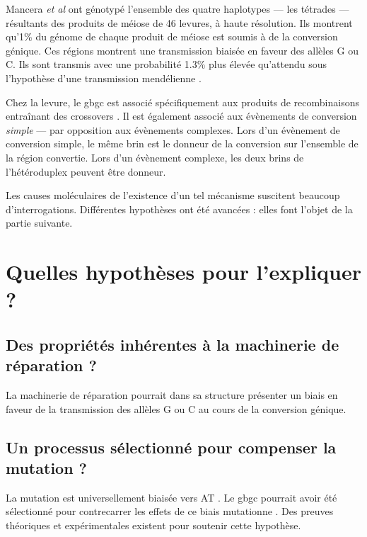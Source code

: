\documentclass[11pt, oneside]{scrartcl}
\begin{document}

Mancera \emph{et al} \cite{mancera_high-resolution_2008} ont génotypé l'ensemble des
quatre haplotypes --- les tétrades --- résultants des produits de méiose de 46
levures, à haute résolution. Ils montrent qu'1\% du génome de chaque produit de
méiose est soumis à de la conversion génique. Ces régions montrent une
transmission biaisée en faveur des allèles G ou C. Ils sont transmis avec une
probabilité 1.3\% plus élevée qu'attendu sous l'hypothèse d'une transmission
mendélienne \cite{mancera_high-resolution_2008}. 

Chez la levure, le \ac{gbgc} est associé spécifiquement aux produits de
recombinaisons entraînant des crossovers \cite{lesecque_gc-biased_2013}. Il est
également associé aux évènements de conversion \emph{simple} --- par opposition aux
évènements complexes. Lors d'un évènement de conversion simple, le même brin est
le donneur de la conversion sur l'ensemble de la région convertie. Lors d'un
évènement complexe, les deux brins de l'hétéroduplex peuvent être donneur. 

\begin{transition}
  Les causes moléculaires de l'existence d'un tel mécanisme suscitent beaucoup
  d'interrogations. Différentes hypothèses ont été avancées : elles font l'objet
  de la partie suivante. 
\end{transition}

\section{Quelles hypothèses pour l'expliquer ?}
\label{sec:orgheadline11}
\subsection{Des propriétés inhérentes à la machinerie de réparation ?}
\label{sec:orgheadline9}
La machinerie de réparation pourrait dans sa structure présenter un biais en
faveur de la transmission des allèles G ou C au cours de la conversion génique. 
\subsection{Un processus sélectionné pour compenser la mutation ?}
\label{sec:orgheadline10}
La mutation est universellement biaisée vers AT
\cite{lynch_rate_2010,hershberg_evidence_2010}. Le \ac{gbgc} pourrait avoir été
sélectionné pour contrecarrer les effets de ce biais mutationne
\cite{marais_biased_2003}. Des preuves théoriques et expérimentales existent
pour soutenir cette hypothèse.
\end{document}
